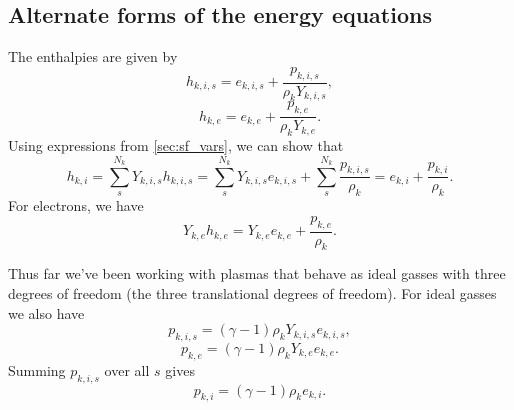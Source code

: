 \documentclass[a4paper,11pt]{report}
\begin{document}
\subsection{Alternate forms of the energy equations}

The enthalpies are given by
\begin{equation}
    h_{k,i,s} = e_{k,i,s} + \frac{p_{k,i,s}}{\rho_k Y_{k,i,s}},
\end{equation}
 \begin{equation}   
    h_{k,e} = e_{k,e} + \frac{p_{k,e}}{\rho_k Y_{k,e}}.
\end{equation}
Using expressions from \cref{sec:sf_vars}, we can show that
\begin{equation}
    \label{eq:sf_alternate_hki_rhok}
    h_{k,i} = \sum_s^{N_k} Y_{k,i,s} h_{k,i,s} = \sum_s^{N_k} Y_{k,i,s} e_{k,i,s} + \sum_{s}^{N_k} \frac{p_{k,i,s}}{\rho_k} = e_{k,i} + \frac{p_{k,i}}{\rho_k}.
\end{equation}
For electrons, we have
\begin{equation}
    \label{eq:sf_alternate_hke_rho}
    Y_{k,e} h_{k,e} = Y_{k,e} e_{k,e} + \frac{p_{k,e}}{\rho_k}.
\end{equation}

Thus far we've been working with plasmas that behave as ideal gasses with three degrees of freedom (the three translational degrees of freedom). For ideal gasses we also have 
\begin{equation}
    \label{eq:sf_alternate_p_kis}
    p_{k,i,s} = (\gamma - 1) \rho_k Y_{k,i,s} e_{k,i,s},
\end{equation}
\begin{equation}
    \label{eq:sf_alternate_p_ke}
    p_{k,e} = (\gamma - 1) \rho_k Y_{k,e} e_{k,e}.
\end{equation}
Summing $p_{k,i,s}$ over all $s$ gives
\begin{equation}
    \label{eq:sf_alternate_p_ki}
    p_{k,i} = (\gamma - 1) \rho_k e_{k,i}.
\end{equation}
\end{document}
